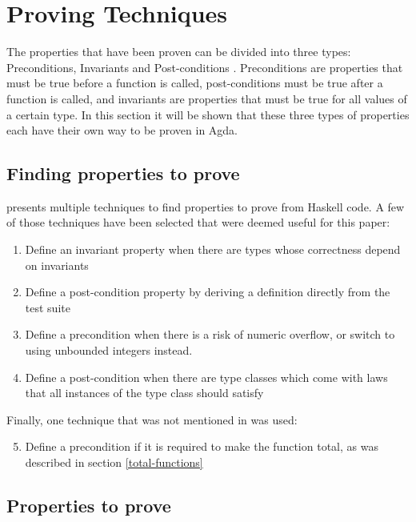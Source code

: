 \section{Proving Techniques}

The properties that have been proven can be divided into three types: Preconditions, Invariants and Post-conditions \cite{meyer_1992}. Preconditions are properties that must be true before a function is called, post-conditions must be true after a function is called, and invariants are properties that must be true for all values of a certain type. In this section it will be shown that these three types of properties each have their own way to be proven in Agda.

\subsection{Finding properties to prove}\label{finding_props_to_prove}
\cite{BREITNER2021} presents multiple techniques to find properties to prove from Haskell code. A few of those techniques have been selected that were deemed useful for this paper:
\begin{enumerate}
	\item Define an invariant property when there are types whose correctness depend on invariants
		\cite[p. 7]{BREITNER2021}
	\item Define a post-condition property by deriving a definition directly from the test suite
		\cite[p. 9]{BREITNER2021}
	\item Define a precondition when there is a risk of numeric overflow, or switch to using unbounded integers instead. 
		\cite[p. 9]{BREITNER2021}
	\item Define a post-condition when there are type classes which come with laws that all instances of the type class should satisfy
		\cite[p. 10]{BREITNER2021}
\end{enumerate}
Finally, one technique that was not mentioned in \cite{BREITNER2021} was used:
\begin{enumerate}
	\setcounter{enumi}{4}
	\item Define a precondition if it is required to make the function total, as was described in section \ref{total-functions}
\end{enumerate}


\subsection{Properties to prove}\label{props_to_prove}

